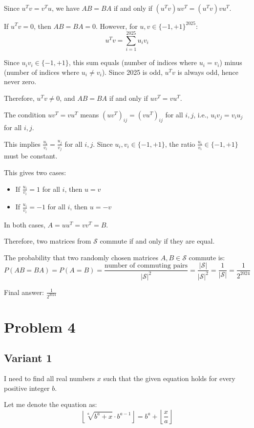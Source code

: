 \documentclass[12pt,a4paper]{article}
\theoremstyle{definition}
\begin{document}
    Since $u^Tv = v^Tu$, we have $AB = BA$ if and only if $(u^Tv)uv^T = (u^Tv)vu^T$.

    If $u^Tv = 0$, then $AB = BA = 0$. However, for $u, v \in \{-1, +1\}^{2025}$:
    $$u^Tv = \sum_{i=1}^{2025} u_iv_i$$

    Since $u_iv_i \in \{-1, +1\}$, this sum equals (number of indices where $u_i = v_i$) minus (number of indices where $u_i \neq v_i$). Since 2025 is odd, $u^Tv$ is always odd, hence never zero.

    Therefore, $u^Tv \neq 0$, and $AB = BA$ if and only if $uv^T = vu^T$.

    The condition $uv^T = vu^T$ means $(uv^T)_{ij} = (vu^T)_{ij}$ for all $i,j$, i.e., $u_iv_j = v_iu_j$ for all $i,j$.

    This implies $\frac{u_i}{v_i} = \frac{u_j}{v_j}$ for all $i,j$. Since $u_i, v_i \in \{-1, +1\}$, the ratio $\frac{u_i}{v_i} \in \{-1, +1\}$ must be constant.

    This gives two cases:
    \begin{itemize}
        \item If $\frac{u_i}{v_i} = 1$ for all $i$, then $u = v$
        \item If $\frac{u_i}{v_i} = -1$ for all $i$, then $u = -v$
    \end{itemize}

    In both cases, $A = uu^T = vv^T = B$.

    Therefore, two matrices from $\mathcal{S}$ commute if and only if they are equal.

    The probability that two randomly chosen matrices $A, B \in \mathcal{S}$ commute is:
    $$P(AB = BA) = P(A = B) = \frac{\text{number of commuting pairs}}{|\mathcal{S}|^2} = \frac{|\mathcal{S}|}{|\mathcal{S}|^2} = \frac{1}{|\mathcal{S}|} = \frac{1}{2^{2024}}$$

    Final answer: $\frac{1}{2^{2024}}$

\section{Problem 4}
\subsection{Variant 1}
    I need to find all real numbers $x$ such that the given equation holds for every positive integer $b$.

    Let me denote the equation as:
    $$\left\lfloor \sqrt[a]{b^a + x} \cdot b^{a-1} \right\rfloor = b^a + \left\lfloor \frac{x}{a} \right\rfloor$$
\end{document}
